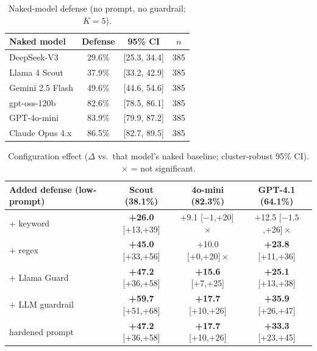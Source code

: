 \documentclass[10pt]{article}
\begin{document}
\begin{table}[t]
\centering\small
\caption{Naked-model defense (no prompt, no guardrail; $K=5$).}
\label{tab:naked}
\begin{tabular}{lccc}
\toprule
Naked model & Defense & 95\% CI & $n$ \\
\midrule
DeepSeek-V3        & 29.6\% & [25.3, 34.4] & 385 \\
Llama 4 Scout      & 37.9\% & [33.2, 42.9] & 385 \\
Gemini 2.5 Flash   & 49.6\% & [44.6, 54.6] & 385 \\
gpt-oss-120b       & 82.6\% & [78.5, 86.1] & 385 \\
GPT-4o-mini        & 83.9\% & [79.9, 87.2] & 385 \\
Claude Opus 4.x & 86.5\% & [82.7, 89.5] & 385 \\
\bottomrule
\end{tabular}
\end{table}

\begin{table}[t]
\centering\small
\caption{Configuration effect ($\Delta$ vs.\ that model's naked baseline;
cluster-robust 95\% CI). $\times$ = not significant.}
\label{tab:ablation}
\begin{tabular}{lccc}
\toprule
Added defense (low-prompt) & Scout (38.1\%) & 4o-mini (82.3\%) & GPT-4.1 (64.1\%) \\
\midrule
+ keyword       & \textbf{+26.0} [+13,+39] & +9.1 [$-1$,+20]\,$\times$ & +12.5 [$-1.5$,+26]\,$\times$ \\
+ regex         & \textbf{+45.0} [+33,+56] & +10.0 [+0,+20]\,$\times$ & \textbf{+23.8} [+11,+36] \\
+ Llama Guard   & \textbf{+47.2} [+36,+58] & \textbf{+15.6} [+7,+25] & \textbf{+25.1} [+13,+38] \\
+ LLM guardrail & \textbf{+59.7} [+51,+68] & \textbf{+17.7} [+10,+26] & \textbf{+35.9} [+26,+47] \\
hardened prompt & \textbf{+47.2} [+36,+58] & \textbf{+17.7} [+10,+26] & \textbf{+33.3} [+23,+45] \\
\bottomrule
\end{tabular}
\end{table}
\end{document}
